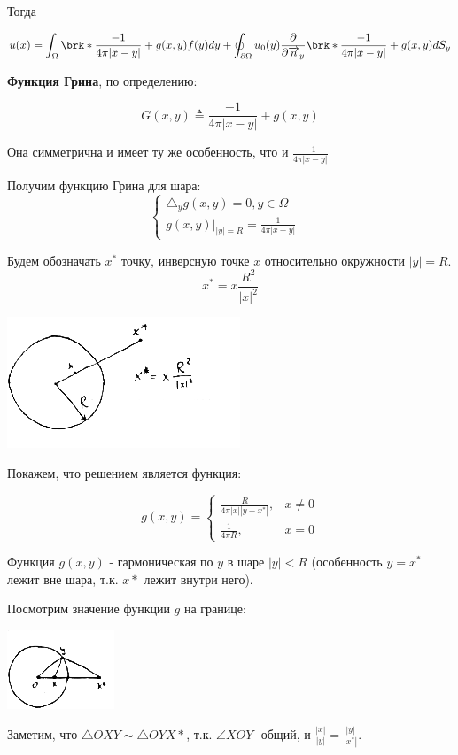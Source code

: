 Тогда

$$u(x) = \int_{\Omega} {\brk*{\frac{-1}{4 \pi |x-y|} +g(x,y)} f(y) dy} + \oint_{\partial \Omega} {u_0(y) \frac{\partial}{\partial \overrightarrow{n}_y} \brk*{\frac{-1}{4 \pi |x-y|}+g(x,y)}dS_y}
$$

\textbf{Функция Грина}, по определению:

$$G(x,y) \triangleq  \frac{-1}{4 \pi |x-y|} + g(x,y) $$

Она симметрична и имеет ту же особенность, что и $\frac{-1}{4 \pi |x-y|}$







Получим функцию Грина для шара:
\[\begin{cases}
   \triangle_y g(x,y) = 0, y \in \Omega \\
   g(x,y)|_{|y|=R} = \frac{1}{4 \pi |x-y|}& 
\end{cases}\]  

Будем обозначать $x^*$ точку, инверсную точке $x$ относительно окружности $|y|=R$.
$$x^* = x \frac{R^2}{|x|^2}$$
\begin{center}
\includegraphics{20_1_new}
\end{center}
Покажем, что решением является функция:

\[g(x,y) = \begin{cases}
   \frac{R}{4 \pi |x| |y-x^*|},   & x \ne 0 \\
   \frac{1}{4 \pi R},& x=0
\end{cases}\]

Функция $g(x,y)$ - гармоническая по $y$ в шаре $|y|<R$ (особенность $y=x^*$ лежит вне шара, т.к. $x*$ лежит внутри него).

Посмотрим значение функции $g$ на границе:
\begin{center}
\includegraphics{20_2_new}
\end{center}
Заметим, что $\triangle OXY \sim \triangle OYX*$, т.к. $\angle XOY$- общий, и $\frac{|x|}{|y|}  =\frac{|y|}{|x^*|}$.

